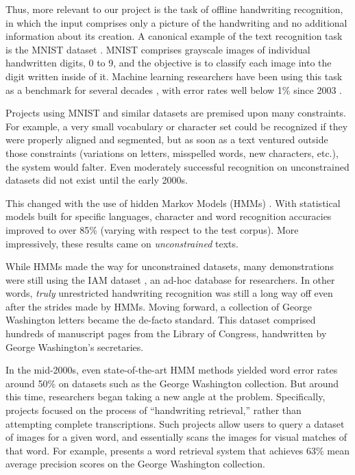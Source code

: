 \documentclass[final]{ukthesis}
\begin{document}
Thus, more relevant to our project is the task of offline handwriting recognition, in which the input comprises only a picture of the handwriting and no additional information about its creation. A canonical example of the text recognition task is the MNIST dataset \cite{lecun1998mnist}. MNIST comprises grayscale images of individual handwritten digits, 0 to 9, and the objective is to classify each image into the digit written inside of it. Machine learning researchers have been using this task as a benchmark for several decades \cite{bottou1994comparison}, with error rates well below 1\% since 2003 \cite{kussul2004improved}.

Projects using MNIST and similar datasets are premised upon many constraints. For example, a very small vocabulary or character set could be recognized if they were properly aligned and segmented, but as soon as a text ventured outside those constraints (variations on letters, misspelled words, new characters, etc.), the system would falter. Even moderately successful recognition on unconstrained datasets did not exist until the early 2000s.

This changed with the use of hidden Markov Models (HMMs) \cite{marti2001using,bunke2004offline,el1999hmm}. With statistical models built for specific languages, character and word recognition accuracies improved to over 85\% (varying with respect to the test corpus). More impressively, these results came on { \em unconstrained} texts.

While HMMs made the way for unconstrained datasets, many demonstrations were still using the IAM dataset \cite{marti2002iam}, an ad-hoc database for researchers. In other words, {\em truly} unrestricted handwriting recognition was still a long way off even after the strides made by HMMs. Moving forward, a collection of George Washington letters became the de-facto standard. This dataset comprised hundreds of manuscript pages from the Library of Congress, handwritten by George Washington's secretaries.

In the mid-2000s, even state-of-the-art HMM methods yielded word error rates around 50\% on datasets such as the George Washington collection. But around this time, researchers began taking a new angle at the problem. Specifically, projects focused on the process of ``handwriting retrieval,'' rather than attempting complete transcriptions. Such projects allow users to query a dataset of images for a given word, and essentially scans the images for visual matches of that word. For example, \cite{rath2004search} presents a word retrieval system that achieves 63\% mean average precision scores on the George Washington collection.
\end{document}
